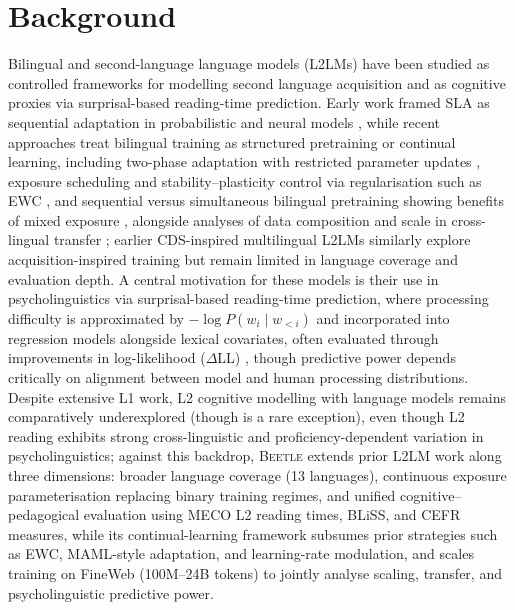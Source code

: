 \documentclass[11pt]{article}
\begin{document}
\section{Background}\label{sec:related}
Bilingual and second-language language models (L2LMs) have been studied as controlled frameworks for modelling second language acquisition and as cognitive proxies via surprisal-based reading-time prediction. Early work framed SLA as sequential adaptation in probabilistic and neural models \citep{matusevych-etal-2013-computational}, while recent approaches treat bilingual training as structured pretraining or continual learning, including two-phase adaptation with restricted parameter updates \citep{aoyama2024modeling}, exposure scheduling and stability--plasticity control via regularisation such as EWC \citep{constantinescu2025investigating}, and sequential versus simultaneous bilingual pretraining showing benefits of mixed exposure \citep{arnett-etal-2025-acquisition}, alongside analyses of data composition and scale in cross-lingual transfer \citep{feng2026bilingual}; earlier CDS-inspired multilingual L2LMs \citep{yadavalli-etal-2023-slabert, oba-etal-2023-second} similarly explore acquisition-inspired training but remain limited in language coverage and evaluation depth. A central motivation for these models is their use in psycholinguistics via surprisal-based reading-time prediction, where processing difficulty is approximated by $-\log P(w_i \mid w_{<i})$ and incorporated into regression models alongside lexical covariates, often evaluated through improvements in log-likelihood ($\Delta$LL) \citep{wilcox2020predictive, kaye2025sentence}, though predictive power depends critically on alignment between model and human processing distributions. Despite extensive L1 work, L2 cognitive modelling with language models remains comparatively underexplored (though \citet{aoyama2024modeling} is a rare exception), even though L2 reading exhibits strong cross-linguistic and proficiency-dependent variation in psycholinguistics; against this backdrop, \textsc{Beetle} extends prior L2LM work along three dimensions: broader language coverage (13 languages), continuous exposure parameterisation replacing binary training regimes, and unified cognitive–pedagogical evaluation using MECO L2 reading times, BLiSS, and CEFR measures, while its continual-learning framework subsumes prior strategies such as EWC, MAML-style adaptation, and learning-rate modulation, and scales training on FineWeb (100M--24B tokens) to jointly analyse scaling, transfer, and psycholinguistic predictive power.
\end{document}
